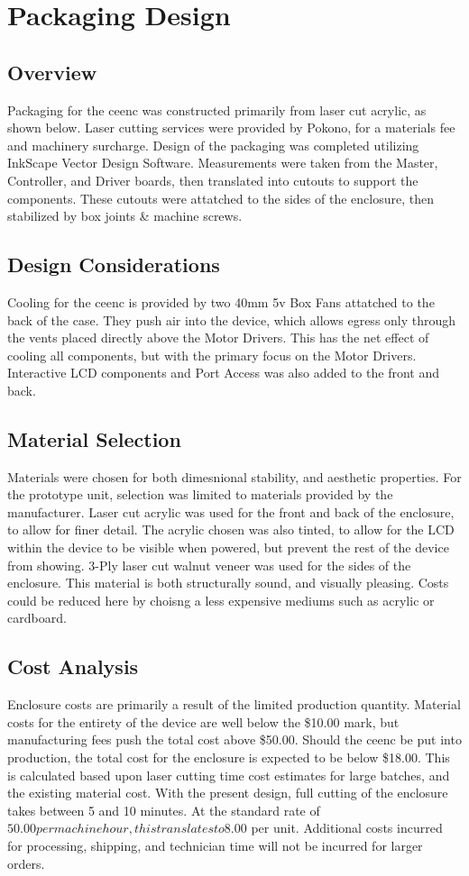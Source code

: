 \section{Packaging Design}
\subsection{Overview}
Packaging for the \gls{ceenc} was constructed primarily from laser cut acrylic, as shown below. 
Laser cutting services were provided by Pokono, for a materials fee and machinery surcharge.
Design of the packaging was completed utilizing InkScape Vector Design Software.
Measurements were taken from the Master, Controller, and Driver boards, then translated into cutouts to support the components.
These cutouts were attatched to the sides of the enclosure, then stabilized by box joints \& machine screws.

\subsection{Design Considerations}
Cooling for the \gls{ceenc} is provided by two 40mm 5v Box Fans attatched to the back of the case.
They push air into the device, which allows egress only through the vents placed directly above the Motor Drivers.
This has the net effect of cooling all components, but with the primary focus on the Motor Drivers.
Interactive LCD components and Port Access was also added to the front and back.

\subsection{Material Selection}
Materials were chosen for both dimesnional stability, and aesthetic properties.
For the prototype unit, selection was limited to materials provided by the manufacturer.
Laser cut acrylic was used for the front and back of the enclosure, to allow for finer detail.
The acrylic chosen was also tinted, to allow for the LCD within the device to be visible when powered, but prevent the rest of the device from showing.
3-Ply laser cut walnut veneer was used for the sides of the enclosure.
This material is both structurally sound, and visually pleasing. 
Costs could be reduced here by choisng a less expensive mediums such as acrylic or cardboard.

\subsection{Cost Analysis}
Enclosure costs are primarily a result of the limited production quantity. 
Material costs for the entirety of the device are well below the \$10.00 mark, but manufacturing fees push the total cost above \$50.00.
Should the \gls{ceenc} be put into production, the total cost for the enclosure is expected to be below \$18.00.
This is calculated based upon laser cutting time cost estimates for large batches, and the existing material cost.
With the present design, full cutting of the enclosure takes between 5 and 10 minutes.
At the standard rate of $50.00 per machine hour, this translates to $8.00 per unit.
Additional costs incurred for processing, shipping, and technician time will not be incurred for larger orders.

